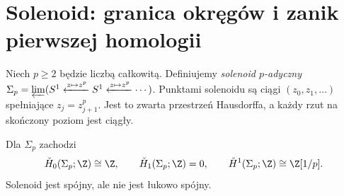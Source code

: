 \section{Solenoid: granica okręgów i zanik pierwszej homologii}
Niech $p\ge2$ będzie liczbą całkowitą. Definiujemy
\emph{solenoid $p$-adyczny}
$\Sigma_p=\varprojlim(S^1\xleftarrow{z\mapsto z^p}S^1
\xleftarrow{z\mapsto z^p}\cdots)$.
Punktami solenoidu są ciągi $(z_0,z_1,\ldots)$ spełniające
$z_j=z_{j+1}^p$. Jest to zwarta przestrzeń Hausdorffa,
a każdy rzut na skończony poziom jest ciągły.

\begin{twierdzenie}
\label{thm:solenoid-v4}
Dla $\Sigma_p$ zachodzi
\[
\check H_0(\Sigma_p;\Z)\cong\Z,\qquad
\check H_1(\Sigma_p;\Z)=0,\qquad
\check H^{1}(\Sigma_p;\Z)\cong\Z[1/p].
\]
Solenoid jest spójny, ale nie jest łukowo spójny.
\end{twierdzenie}
